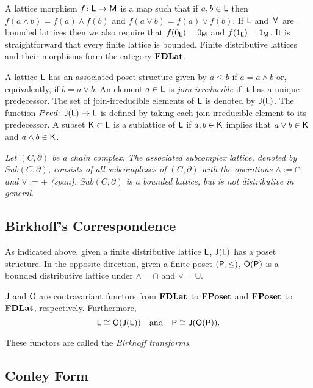A lattice morphism $f \colon {\mathsf L}\to {\mathsf M}$ is a map such that if $a,b\in {\mathsf L}$ then $f(a\wedge b) = f(a)\wedge f(b)$ and $f(a\vee b) = f(a)\vee f(b)$.  
If ${\mathsf L}$ and ${\mathsf M}$ are bounded lattices then we also require that $f(0_{\mathsf L})=0_{\mathsf M}$ and $f(1_{\mathsf L})=1_{\mathsf M}$.    
It is straightforward that every finite lattice is bounded. 
Finite distributive lattices and their morphisms form the category ${\bf FDLat}$.

A lattice ${\mathsf L}$ has an associated poset structure given by $a\leq b$ if $a=a\wedge b$ or, equivalently, if $b=a\vee b$.
An element $a\in {\mathsf L}$ is {\em join-irreducible} if it has a unique predecessor.   
The set of join-irreducible elements of ${\mathsf L}$ is denoted by ${\mathsf J}({\mathsf L})$.
The function $Pred \colon {\mathsf J}({\mathsf L})\to {\mathsf L}$ is defined by taking each join-irreducible element to its predecessor.  
A subset ${\mathsf K}\subset {\mathsf L}$ is  a sublattice of ${\mathsf L}$ if $a,b\in {\mathsf K}$ implies that $a\vee b\in {\mathsf K}$ and $a\wedge b\in {\mathsf K}$.  

\begin{ex}
{\em
Let $(C,\partial)$ be a chain complex.  
The associated \emph{subcomplex lattice}, denoted by $Sub(C,\partial)$, consists of all  subcomplexes of $(C,\partial)$ with the operations $\wedge := \cap$ and $\vee := +$ (span).
$Sub(C,\partial)$ is a bounded lattice, but  is not distributive in general.
}
\end{ex}

\subsection{Birkhoff's Correspondence}\label{sec:birkhoff}
As indicated above, given a finite distributive lattice ${\mathsf L}$,  ${\mathsf J}({\mathsf L})$ has a poset structure.
In the opposite direction, given a finite poset $({\mathsf P},\leq)$, ${\mathsf O}({\mathsf P})$ is a bounded distributive lattice under $\wedge = \cap$ and $\vee = \cup$.

\begin{thm}\label{thm:birkhoff}
${\mathsf J}$ and ${\mathsf O}$ are contravariant functors from ${\bf FDLat}$ to ${\bf FPoset}$ and ${\bf FPoset}$ to ${\bf FDLat}$, respectively.
Furthermore,
\[
{\mathsf L}\cong {\mathsf O}({\mathsf J}({\mathsf L}))\quad\text{and}\quad {\mathsf P}\cong {\mathsf J}({\mathsf O}({\mathsf P})).
\]
\end{thm}

These functors are called the {\em Birkhoff transforms}.

\subsection{Conley Form}

